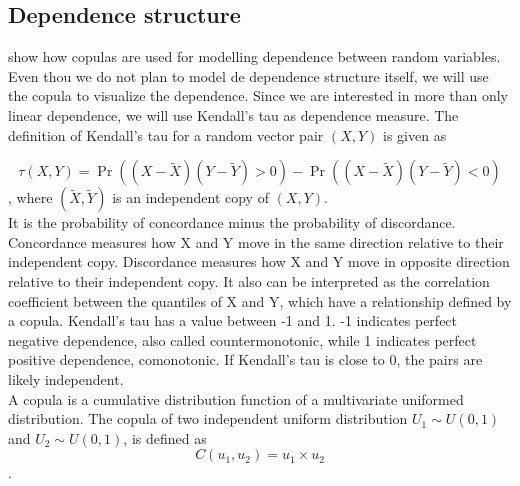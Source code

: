 	\subsection{Dependence structure}
	\cite{embrechts2001modelling}  show how copulas are used for modelling dependence between random variables. Even thou we do  not plan to model de dependence structure itself, we will use the copula to visualize the dependence. Since we are interested in more than only linear dependence, we will use Kendall’s tau as dependence measure. The definition of Kendall’s tau for a random vector pair $(X,Y)$ is given as
	
	$$ \tau(X,Y) = \Pr( (X - \widetilde{X}) (Y - \widetilde{Y}) > 0 ) - \Pr( (X - \widetilde{X}) (Y - \widetilde{Y}) < 0 )$$
	, where $(\widetilde{X},\widetilde{Y})$ is an independent copy of $(X,Y)$.\\
	
	It is the probability of concordance minus the probability of discordance. Concordance measures how X and Y move in the same direction relative to their independent copy. Discordance measures how X and Y move in opposite direction relative to their independent copy. It also can be interpreted as the correlation coefficient between the quantiles of X and Y, which have a relationship defined by a copula. Kendall’s tau has a value between -1 and 1. -1 indicates perfect negative dependence, also called countermonotonic, while 1 indicates perfect positive dependence, comonotonic. If Kendall’s tau is close to 0, the pairs are likely independent.\\
	A copula is a cumulative distribution function of a multivariate uniformed distribution. The copula of two independent uniform distribution $U_1 \sim U(0,1)$ and $U_2 \sim U(0,1)$, is defined as
	$$C(u_1,u_2) = u_1 \times u_2$$.
	
